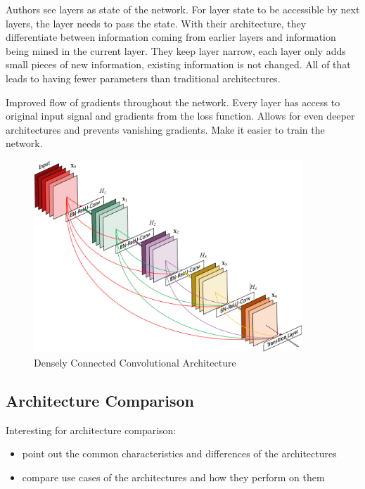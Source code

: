 Authors see layers as state of the network. For layer state to be accessible by next layers, the layer needs to pass the state. With their architecture, they differentiate between information coming from earlier layers and information being mined in the current layer. They keep layer narrow, each layer only adds small pieces of new information, existing information is not changed. All of that leads to having fewer parameters than traditional architectures.

Improved flow of gradients throughout the network. Every layer has access to original input signal and gradients from the loss function. Allows for even deeper architectures and prevents vanishing gradients. Make it easier to train the network.


\begin{figure}[h]
    \centering
    \includegraphics[width=0.9\textwidth]{images/dense-net-architecture}
    \caption{Densely Connected Convolutional Architecture \cite{densenet18}}
    \label{fig:densenet_architecture}
\end{figure}

\subsection{Architecture Comparison}
Interesting for architecture comparison: \cite{imseg_architecures}

\begin{itemize}
    \item point out the common characteristics and differences of the architectures
    \item compare use cases of the architectures and how they perform on them
\end{itemize}

\newpage